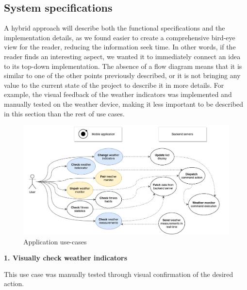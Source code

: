 \clearpage
\subsection{System specifications}

A hybrid approach will describe both the functional specifications and the implementation details, as we found easier to create a comprehensive bird-eye view for the reader, reducing the information seek time. In other words, if the reader finds an interesting aspect, we wanted it to immediately connect an idea to its top-down implementation. The absence of a flow diagram means that it is similar to one of the other points previously described, or it is not bringing any value to the current state of the project to describe it in more details. For example, the visual feedback of the weather indicators was implemented and manually tested on the weather device, making it less important to be described in this section than the rest of use cases.

\begin{figure}[!htb]
    \centering
    \includegraphics[width = 15.5cm]{figures/ucd}
    \caption{Application use-cases}
    \label{fig:usecases}
\end{figure}

\vspace{4mm}
\textbf{1. Visually check weather indicators}
\vspace{4mm}

This use case was manually tested through visual confirmation of the desired action.

